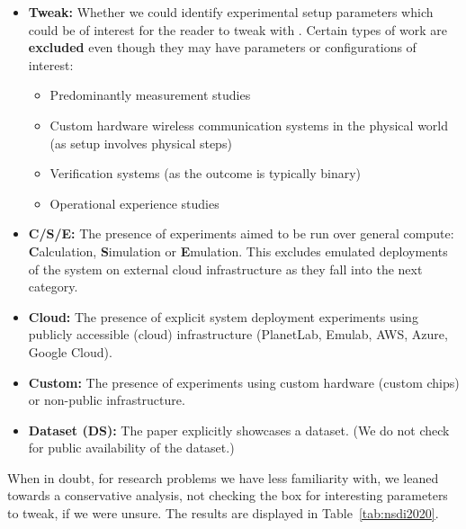 \begin{itemize}[leftmargin=10pt,itemsep=2pt,topsep=2pt]

    \item \textbf{Tweak:} Whether we could identify experimental setup parameters which could be of interest for the reader to tweak with \sysname. Certain types of work are \textbf{excluded} even though they may have parameters or configurations of interest:
    
    \begin{itemize}[leftmargin=10pt,itemsep=2pt,topsep=2pt]
        \item Predominantly measurement studies
        \item Custom hardware wireless communication systems in the physical world (as setup involves physical steps)
        \item Verification systems (as the outcome is typically binary)
        \item Operational experience studies
    \end{itemize}

    \item \textbf{C/S/E:} The presence of experiments aimed to be run over general compute: \textbf{C}alculation, \textbf{S}imulation or \textbf{E}mulation. This excludes emulated deployments of the system on external cloud infrastructure as they fall into the next category.
    
    \item \textbf{Cloud:} The presence of explicit system deployment experiments using publicly accessible (cloud) infrastructure (\eg PlanetLab, Emulab, AWS, Azure, Google Cloud).
    
    \item \textbf{Custom:} The presence of experiments using custom hardware (\eg custom chips) or non-public infrastructure.
    
    \item \textbf{Dataset (DS):} The paper explicitly showcases a dataset. (We do not check for public availability of the dataset.)
    
\end{itemize}

\noindent When in doubt, \eg for research problems we have less familiarity with, we leaned towards a conservative analysis, \eg not checking the box for interesting parameters to tweak, if we were unsure. The results are displayed in Table~\ref{tab:nsdi2020}.


